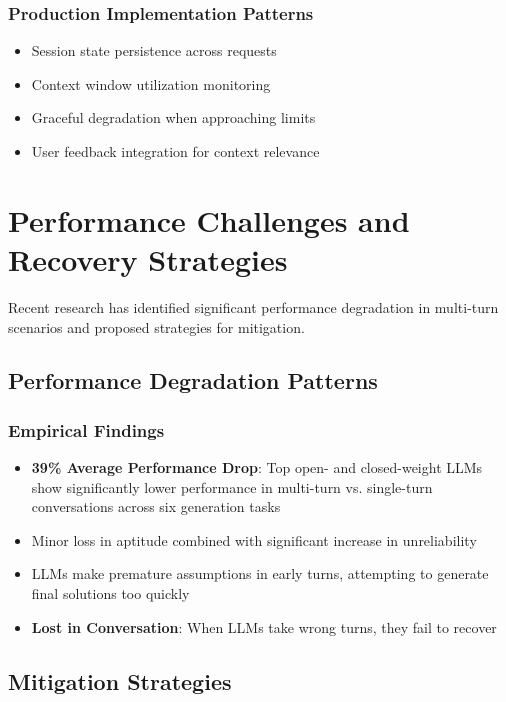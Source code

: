 \documentclass[11pt,letterpaper]{article}
\begin{document}
\subsubsection{Production Implementation Patterns}
\begin{itemize}[leftmargin=*]
    \item Session state persistence across requests
    \item Context window utilization monitoring
    \item Graceful degradation when approaching limits
    \item User feedback integration for context relevance
\end{itemize}

\section{Performance Challenges and Recovery Strategies}

Recent research has identified significant performance degradation in multi-turn scenarios and proposed strategies for mitigation.

\subsection{Performance Degradation Patterns}

\subsubsection{Empirical Findings}
\begin{itemize}[leftmargin=*]
    \item \textbf{39\% Average Performance Drop}: Top open- and closed-weight LLMs show significantly lower performance in multi-turn vs. single-turn conversations across six generation tasks
    \item Minor loss in aptitude combined with significant increase in unreliability
    \item LLMs make premature assumptions in early turns, attempting to generate final solutions too quickly
    \item \textbf{Lost in Conversation}: When LLMs take wrong turns, they fail to recover
\end{itemize}

\subsection{Mitigation Strategies}
\end{document}
